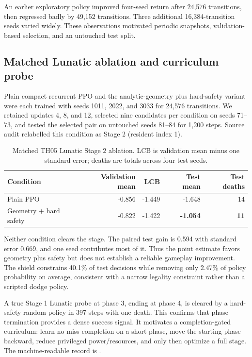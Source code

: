 \documentclass[10pt]{article}
\begin{document}
An earlier exploratory policy improved four-seed return after 24,576
transitions, then regressed badly by 49,152 transitions.  Three additional
16,384-transition seeds varied widely.  These observations motivated periodic
snapshots, validation-based selection, and an untouched test split.

\subsection{Matched Lunatic ablation and curriculum probe}

Plain compact recurrent PPO and the analytic-geometry plus hard-safety variant
were each trained with seeds 1011, 2022, and 3033 for 24,576 transitions.  We
retained updates 4, 8, and 12, selected nine candidates per condition on seeds
71--73, and tested the selected pair on untouched seeds 81--84 for 1,200 steps.
Source audit relabelled this condition as Stage 2 (resident index 1).

\begin{table}[ht]
  \centering
  \caption{Matched TH05 Lunatic Stage 2 ablation.  LCB is validation mean minus
  one standard error; deaths are totals across four test seeds.}
  \label{tab:lunatic-ablation}
  \begin{tabular}{lrrrr}
    \toprule
    Condition & Validation mean & LCB & Test mean & Test deaths \\
    \midrule
    Plain PPO & -0.856 & -1.449 & -1.648 & 14 \\
    Geometry + hard safety & -0.822 & -1.422 & \textbf{-1.054} & \textbf{11} \\
    \bottomrule
  \end{tabular}
\end{table}

Neither condition clears the stage.  The paired test gain is 0.594 with
standard error 0.669, and one seed contributes most of it.  Thus the point
estimate favors geometry plus safety but does not establish a reliable gameplay
improvement.  The shield constrains 40.1\% of test decisions while removing
only 2.47\% of policy probability on average, consistent with a narrow legality
constraint rather than a scripted dodge policy.

A true Stage 1 Lunatic probe at phase 3, ending at phase 4, is cleared by a
hard-safety random policy in 397 steps with one death.  This confirms that phase
termination provides a dense success signal.  It motivates a completion-gated
curriculum: learn no-miss completion on a short phase, move the starting phase
backward, reduce privileged power/resources, and only then optimize a full
stage.  The machine-readable record is
.
\end{document}
